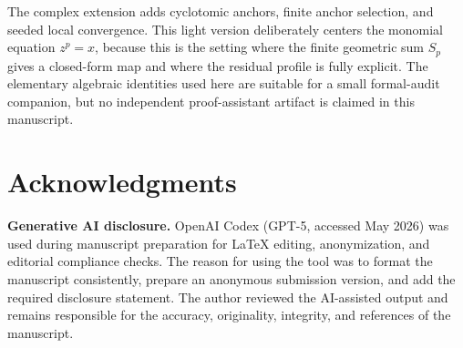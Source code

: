 \documentclass[10pt,a4paper]{article}
\theoremstyle{plain}
\theoremstyle{definition}
\theoremstyle{remark}
\begin{document}
The complex extension adds cyclotomic anchors, finite anchor selection, and
seeded local convergence.  This light version deliberately centers the monomial
equation $z^p=x$, because this is the setting where the finite geometric sum
$S_p$ gives a closed-form map and where the residual profile is fully explicit.
The elementary algebraic identities used here are suitable for a small
formal-audit companion, but no independent proof-assistant artifact is claimed
in this manuscript.

\section*{Acknowledgments}

\textbf{Generative AI disclosure.}
OpenAI Codex (GPT-5, accessed May 2026) was used during manuscript preparation
for LaTeX editing, anonymization, and editorial compliance checks.  The reason
for using the tool was to format the manuscript consistently, prepare an
anonymous submission version, and add the required disclosure statement.  The
author reviewed the AI-assisted output and remains responsible for the accuracy,
originality, integrity, and references of the manuscript.
\end{document}
